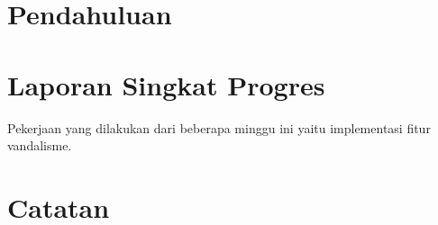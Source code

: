 






\section{Pendahuluan}

\section{Laporan Singkat Progres}

Pekerjaan yang dilakukan dari beberapa minggu ini yaitu implementasi fitur
vandalisme.

\section{Catatan}



\clearpage
{}
\printbibliography

\newpage
\appendix



